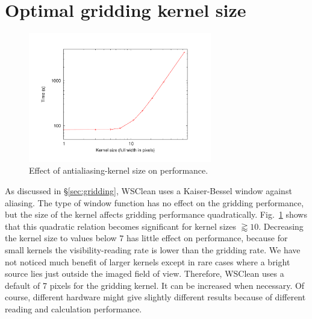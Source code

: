 \documentclass[useAMS,usenatbib]{mn2e}
\DeclareRobustCommand{\TUSSEN}[3]{#2}
\begin{document}
\section{Optimal gridding kernel size} \label{sec:gridding-appendix}
\begin{figure}
\begin{center}
\includegraphics[width=8cm]{img/benchmark-kernelsize/kernel}
\caption{Effect of antialiasing-kernel size on performance.}
\label{fig:timing-kernelsize}
\end{center}
\end{figure}
As discussed in \S\ref{sec:gridding}, WSClean uses a Kaiser-Bessel window against aliasing. The type of window function has no effect on the gridding performance, but the size of the kernel affects gridding performance quadratically. Fig.~\ref{fig:timing-kernelsize} shows that this quadratic relation becomes significant for kernel sizes $\gtrapprox 10$. Decreasing the kernel size to values below $7$ has little effect on performance, because for small kernels the visibility-reading rate is lower than the gridding rate. We have not noticed much benefit of larger kernels except in rare cases where a bright source lies just outside the imaged field of view. Therefore, WSClean uses a default of 7 pixels for the gridding kernel. It can be increased when necessary. Of course, different hardware might give slightly different results because of different reading and calculation performance.

\DeclareRobustCommand{\TUSSEN}[3]{#3}




\label{lastpage}
\end{document}
